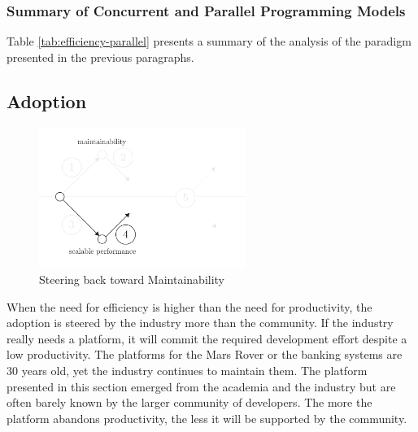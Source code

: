 \subsubsection{Summary of Concurrent and Parallel Programming Models}

Table \ref{tab:efficiency-parallel} presents a summary of the analysis of the paradigm presented in the previous paragraphs.








\subsection{Adoption} \label{chapter3:software-efficiency:adoption}

\begin{figure}[!h]
\begin{center}
\includegraphics[width=0.6\textwidth]{../ressources/state-of-the-art-4.pdf}
\end{center}
\caption{Steering back toward Maintainability}
\label{fig:state-of-the-art-4}
\end{figure}


When the need for efficiency is higher than the need for productivity, the adoption is steered by the industry more than the community.
If the industry really needs a platform, it will commit the required development effort despite a low productivity.
The platforms for the Mars Rover or the banking systems are 30 years old, yet the industry continues to maintain them.
The platform presented in this section emerged from the academia and the industry but are often barely known by the larger community of developers.
The more the platform abandons productivity, the less it will be supported by the community.

